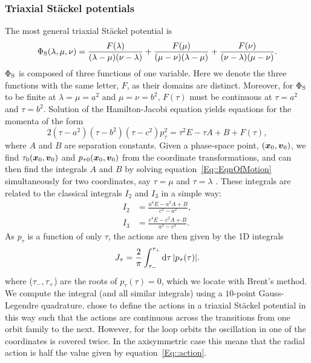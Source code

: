 \documentclass[useAMS,usenatbib,fleqn,a4paper]{mn2e}
\begin{document}
\subsubsection{Triaxial St\"ackel potentials}

The most general triaxial St\"ackel potential is
\begin{equation}
\Phi_{\rm S}(\lambda,\mu,\nu) = \frac{F(\lambda)}{(\lambda-\mu)(\nu-\lambda)}+\frac{F(\mu)}{(\mu-\nu)(\lambda-\mu)}+\frac{F(\nu)}{(\nu-\lambda)(\mu-\nu)}.
\end{equation}
$\Phi_{\rm S}$ is composed of three functions of one variable. Here we denote the
three functions with the same letter, $F$, as their domains are distinct.
Moreover, for $\Phi_{\rm S}$ to be finite at $\lambda=\mu=a^2$ and
$\mu=\nu=b^2$, $F(\tau)$ must be continuous at $\tau=a^2$ and $\tau=b^2$.
Solution of  the Hamilton-Jacobi equation
\citep{deZeeuw1985a} yields equations for the momenta of the form
\begin{equation}
2(\tau-a^2)(\tau-b^2)(\tau-c^2)p_\tau^2=\tau^2 E -\tau A+B + F(\tau),
\label{Eq::EqnOfMotion}
\end{equation}
 where $A$ and $B$ are separation constants.  Given a phase-space
point, $(\vx_0,\vv_0)$, we find $\tau_0(\vx_0,\vv_0)$ and $p_{\tau
0}(\vx_0,\vv_0)$ from  the coordinate transformations, and can then find the
integrals $A$ and $B$ by solving equation~\eqref{Eq::EqnOfMotion} simultaneously
for two coordinates, say $\tau=\mu$ and $\tau=\lambda$ \citep[see][for more details]{deZeeuw1985a}. These integrals are related to
the classical integrals $I_2$ and $I_3$ in a simple way:
\begin{equation}
\begin{split}
I_2&=\frac{a^4 E-a^2 A+B}{c^2-a^2},\\
I_3&=\frac{c^4E-c^2 A+B}{a^2-c^2}.
\end{split}
\end{equation}
As $p_\tau$ is a function of  only $\tau$, the actions are then given by the
1D integrals
\begin{equation}
J_\tau = \frac{2}{\pi}\int_{\tau_-}^{\tau_+} \mathrm{d}\tau\,|p_\tau(\tau)|.
\label{Eq::action}
\end{equation}
where ($\tau_-,\tau_+$) are the roots of $p_\tau(\tau)=0$, which we locate
with Brent's method. We compute the integral (and all similar integrals) using a $10$-point Gauss-Legendre
quadrature. \cite{deZeeuw1985a} chose to define the actions in a triaxial St\"ackel potential in this way such that the actions are continuous across the transitions from one orbit family to the next. However, for the loop orbits the oscillation in one of the coordinates is covered twice. In the axisymmetric case this means that the radial action is half the value given by equation~\eqref{Eq::action}.
\end{document}
